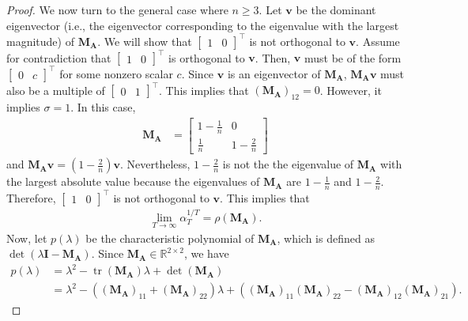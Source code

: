 \documentclass{article}
\theoremstyle{plain}
\theoremstyle{definition}
\theoremstyle{remark}
\def\bigopen#1{\left(#1\right)}
\def\vv{{\bm{v}}}
\def\mA{{\bm{A}}}
\def\mI{{\bm{I}}}
\def\mM{{\bm{M}}}
\newcommand{\R}{\mathbb{R}}
\DeclareMathOperator{\tr}{tr}
\begin{document}
\begin{proof}
We now turn to the general case where $n\ge 3$. Let $\vv$ be the dominant eigenvector (i.e., the eigenvector corresponding to the eigenvalue with the largest magnitude) of $\mM_{\mA}$. We will show that $ \begin{bmatrix}
        1 & 0
\end{bmatrix}^{\top}$ is not orthogonal to $\vv$. Assume for contradiction that $  \begin{bmatrix}
        1 & 0
\end{bmatrix}^{\top}$ is orthogonal to $\vv$. 
Then, $\vv$ must be of the form $
\begin{bmatrix}
        0 & c
\end{bmatrix}^{\top}$ for some nonzero scalar $c$. Since $\vv$ is an eigenvector of $\mM_{\mA}$, $\mM_{\mA}\vv$ must also be a multiple of $ 
\begin{bmatrix}
        0 & 1
\end{bmatrix}^{\top}$. This implies that $(\mM_{\mA})_{12} = 0$. 
However, it implies $\sigma=1$. In this case, 
\begin{align*}
    \mM_{\mA} &= \begin{bmatrix}
        1-\frac{1}{n} & 0 \\
        \frac{1}{n} & 1-\frac{2}{n}
    \end{bmatrix}
\end{align*}
and $\mM_{\mA} \vv = \bigopen{1-\frac{2}{n}} \vv$. 
Nevertheless, $1-\frac{2}{n}$ is not the the eigenvalue of $\mM_{\mA}$ with the largest absolute value because the eigenvalues of $\mM_{\mA}$ are $1-\frac{1}{n}$ and $1-\frac{2}{n}$. Therefore, $
\begin{bmatrix}
        1 & 0
\end{bmatrix}^{\top}$ is not orthogonal to $\vv$. This implies that 
\begin{align*}
    \lim_{T \to \infty} \alpha_T^{1/T} = \rho(\mM_{\mA}).
\end{align*}
Now, let $p(\lambda)$ be the characteristic polynomial of $\mM_{\mA}$, which is defined as $\det(\lambda \mI - \mM_{\mA})$. Since $\mM_{\mA}\in \R^{2\times 2}$, we have 
\begin{align*}
    p(\lambda) &= \lambda^2 - \tr(\mM_{\mA})\lambda + \det (\mM_{\mA}) \\
    &= \lambda^2 - ((\mM_{\mA})_{11} + (\mM_{\mA})_{22})\lambda + ((\mM_{\mA})_{11}(\mM_{\mA})_{22} - (\mM_{\mA})_{12}(\mM_{\mA})_{21}).
\end{align*}


\end{proof}
\end{document}
